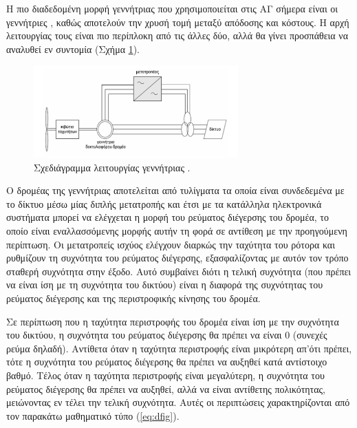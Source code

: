 \documentclass[12pt]{report}
\begin{document}
\subsubsection{{}}
Η πιο διαδεδομένη μορφή γεννήτριας που χρησιμοποιείται στις ΑΓ σήμερα είναι οι γεννήτριες {}, καθώς αποτελούν την χρυσή τομή μεταξύ απόδοσης και κόστους. Η αρχή λειτουργίας τους είναι πιο περίπλοκη από τις άλλες δύο,
αλλά θα γίνει προσπάθεια να αναλυθεί εν συντομία (Σχήμα \ref{fig:dfig}).

\begin{figure}[h]
				\center
				\includegraphics[width=0.7\textwidth]{dfig}
				\captionsetup{width=0.8\textwidth}
				\caption{Σχεδιάγραμμα λειτουργίας γεννήτριας {}.}
				\label{fig:dfig}
\end{figure}

Ο δρομέας της γεννήτριας αποτελείται από τυλίγματα τα οποία είναι συνδεδεμένα με το δίκτυο μέσω μίας διπλής μετατροπής {} και έτσι με τα κατάλληλα ηλεκτρονικά συστήματα μπορεί να ελέγχεται η μορφή του ρεύματος
 διέγερσης του δρομέα, το οποίο είναι εναλλασσόμενης μορφής αυτήν τη φορά σε αντίθεση με την προηγούμενη περίπτωση. 
Οι μετατροπείς ισχύος ελέγχουν διαρκώς την ταχύτητα του ρότορα και ρυθμίζουν τη συχνότητα του ρεύματος διέγερσης, εξασφαλίζοντας με αυτόν τον τρόπο σταθερή συχνότητα στην έξοδο. Αυτό συμβαίνει διότι η τελική συχνότητα (που πρέπει
να είναι ίση με τη συχνότητα του δικτύου) είναι η διαφορά της συχνότητας του ρεύματος διέγερσης και της περιστροφικής κίνησης του δρομέα.

Σε περίπτωση που η ταχύτητα περιστροφής του δρομέα είναι ίση με την συχνότητα του δικτύου, η συχνότητα του ρεύματος διέγερσης θα πρέπει να είναι 0 (συνεχές ρεύμα δηλαδή). Αντίθετα όταν η ταχύτητα περιστροφής είναι μικρότερη απ'ότι
πρέπει, τότε η συχνότητα του ρεύματος διέγερσης θα πρέπει να αυξηθεί κατά αντίστοιχο βαθμό. Τέλος όταν η ταχύτητα περιστροφής είναι μεγαλύτερη, η συχνότητα του ρεύματος διέγερσης θα πρέπει να αυξηθεί, αλλά να είναι αντίθετης
πολικότητας, μειώνοντας εν τέλει την τελική συχνότητα. Αυτές οι περιπτώσεις χαρακτηρίζονται από τον παρακάτω μαθηματικό τύπο (\ref{eq:dfig}).
\end{document}

